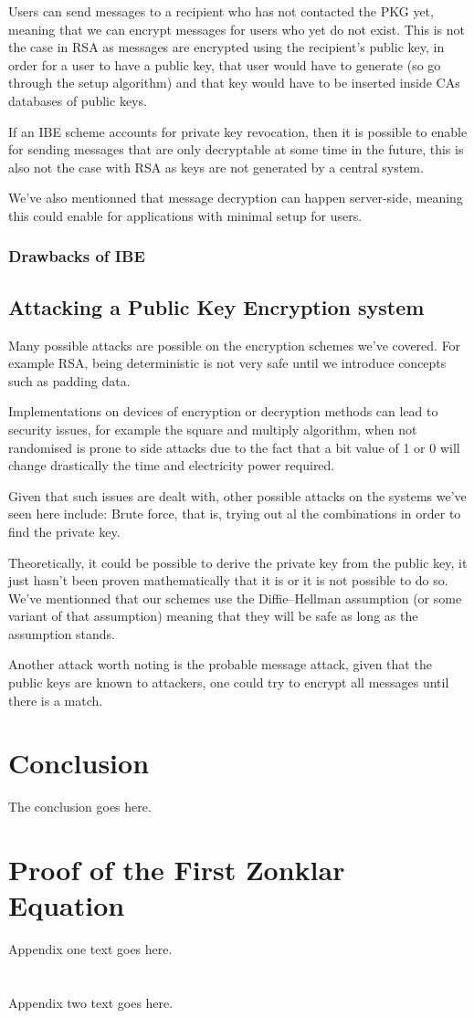 \documentclass[conference]{IEEEtran}
\begin{document}
Users can send messages to a recipient who has not contacted the PKG yet, meaning that 
we can encrypt messages for users who yet do not exist. This is not the case in RSA
as messages are encrypted using the recipient's public key, in order for a user to have a 
public key, that user would have to generate (so go through the setup algorithm) and 
that key would have to be inserted inside CAs databases of public keys.

If an IBE scheme accounts for private key revocation, then it is possible to enable for 
sending messages that are only decryptable at some time in the future, this is also not the 
case with RSA as keys are not generated by a central system.


We've also mentionned that message decryption can happen server-side, meaning 
this could enable for applications with minimal setup for users.
 

\subsubsection{Drawbacks of IBE}


\subsection{Attacking a Public Key Encryption system}
Many possible attacks are possible on the encryption schemes we've covered.
For example RSA, being deterministic is not very safe until we introduce concepts such as 
padding data. 

Implementations on devices of encryption or decryption methods 
can lead to security issues, for example the square and multiply algorithm,
when not randomised is prone to side attacks due to the fact that a bit value of 1 or 0 
will change drastically the time and electricity power required.

Given that such issues are dealt with, other possible attacks on the systems we've seen here include: 
Brute force, that is, trying out al the combinations in order to find the private key.

Theoretically, it could be possible to derive the private key from the public key, it just 
hasn't been proven mathematically that it is or it is not possible to do so.
We've mentionned that our schemes use the Diffie–Hellman assumption (or some variant of that assumption)
meaning that they will be safe as long as the assumption stands.

Another attack worth noting is the probable message attack, given that the public keys are known 
to attackers, one could try to encrypt all messages until there is a match.


\section{Conclusion}
The conclusion goes here.

\appendices
\section{Proof of the First Zonklar Equation}
Appendix one text goes here.

\section{}
Appendix two text goes here.
\end{document}
